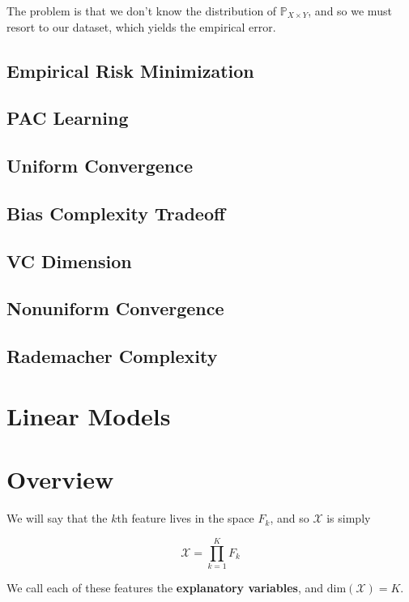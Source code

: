 \documentclass{article}
\theoremstyle{definition}
\begin{document}
  The problem is that we don't know the distribution of $\mathbb{P}_{X \times Y}$, and so we must resort to our dataset, which yields the empirical error.  



  \subsection{Empirical Risk Minimization}

  \subsection{PAC Learning}

  \subsection{Uniform Convergence}

  \subsection{Bias Complexity Tradeoff}

  \subsection{VC Dimension}

  \subsection{Nonuniform Convergence}

  \subsection{Rademacher Complexity}

\section{Linear Models}

\section{Overview}


  We will say that the $k$th feature lives in the space $F_k$, and so $\mathcal{X}$ is simply 

    \[\mathcal{X} = \prod_{k=1}^K  F_k\]

  We call each of these features the \textbf{explanatory variables}, and $\mathrm{dim}(\mathcal{X}) = K$. 
\end{document}

